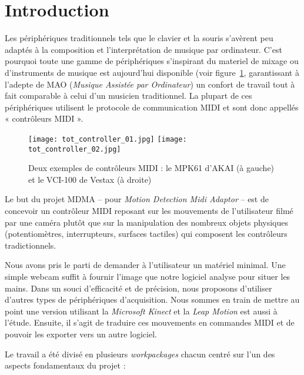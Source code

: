 \section{Introduction}
\par Les périphériques traditionnels tels que le clavier et la souris s'avèrent peu adaptés à la composition et l'interprétation de musique par ordinateur. C'est pourquoi toute une gamme de périphériques s'inspirant du materiel de mixage ou d'instruments de musique est aujourd'hui disponible (voir figure~\ref{MIDI_controllers}, garantissant à l'adepte de MAO (\emph{Musique Assistée par Ordinateur}) un confort de travail tout à fait comparable à celui d'un musicien traditionnel. La plupart de ces périphériques utilisent le protocole de communication MIDI et sont donc appellés « contrôleurs MIDI ».
\begin{figure}[h]
    \centering
    \texttt{[image: tot\_controller\_01.jpg]}
    \texttt{[image: tot\_controller\_02.jpg]}
    \caption{Deux exemples de contrôleurs MIDI : le MPK61 d'AKAI (à gauche) et le VCI-100 de Vestax (à droite)}
    \label{MIDI_controllers}
\end{figure}
\par Le but du projet MDMA  – pour \emph{Motion Detection Midi Adaptor}  – est de concevoir un contrôleur MIDI reposant sur les mouvements de l'utilisateur filmé par une caméra plutôt que sur la manipulation des nombreux objets physiques (potentiomètres, interrupteurs, surfaces tactiles) qui composent les contrôleurs tradictionnels.
\par Nous avons pris le parti de demander à l'utilisateur un matériel minimal. Une simple webcam suffit à fournir l'image que notre logiciel analyse pour situer les mains. Dans un souci d'efficacité et de précision, nous proposons d'utiliser d'autres types de périphériques d'acquisition. Nous sommes en train de mettre au point une version utilisant la \emph{Microsoft Kinect} et la \emph{Leap Motion} est aussi à l'étude. Ensuite, il s'agit de traduire ces mouvements en commandes MIDI et de pouvoir les exporter vers un autre logiciel.
\par Le travail a été divisé en plusieurs \emph{workpackages} chacun centré sur l'un des aspects fondamentaux du projet :
